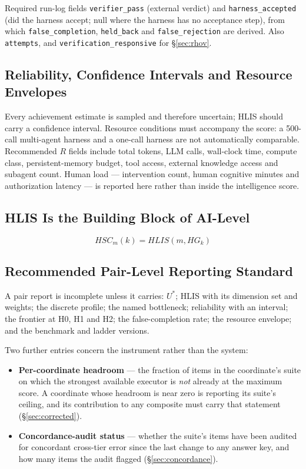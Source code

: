 \begin{claimbox}{Required run-log fields}
\texttt{verifier\_pass} (external verdict) and \texttt{harness\_accepted} (did the harness accept; null where the harness has no acceptance step), from which \texttt{false\_completion}, \texttt{held\_back} and \texttt{false\_rejection} are derived. Also \texttt{attempts}, and \texttt{verification\_responsive} for \S\ref{sec:rhov}.
\end{claimbox}

\subsection{Reliability, Confidence Intervals and Resource Envelopes}\label{sec:resources}

Every achievement estimate is sampled and therefore uncertain; HLIS should carry a confidence interval. Resource conditions must accompany the score: a 500-call multi-agent harness and a one-call harness are not automatically comparable. Recommended $R$ fields include total tokens, LLM calls, wall-clock time, compute class, persistent-memory budget, tool access, external knowledge access and subagent count. Human load --- intervention count, human cognitive minutes and authorization latency --- is reported here rather than inside the intelligence score.

\subsection{HLIS Is the Building Block of AI-Level}

\begin{equation}
HSC_m(k) = HLIS(m, HG_k)
\end{equation}

\subsection{Recommended Pair-Level Reporting Standard}\label{sec:report}

A pair report is incomplete unless it carries: $U^{*}$; HLIS with its dimension set and weights; the discrete profile; the named bottleneck; reliability with an interval; the frontier at H0, H1 and H2; the false-completion rate; the resource envelope; and the benchmark and ladder versions.

Two further entries concern the instrument rather than the system:

\begin{itemize}
\item \textbf{Per-coordinate headroom} --- the fraction of items in the coordinate's suite on which the strongest available executor is \emph{not} already at the maximum score. A coordinate whose headroom is near zero is reporting its suite's ceiling, and its contribution to any composite must carry that statement (\S\ref{sec:corrected}).
\item \textbf{Concordance-audit status} --- whether the suite's items have been audited for concordant cross-tier error since the last change to any answer key, and how many items the audit flagged (\S\ref{sec:concordance}).
\end{itemize}

